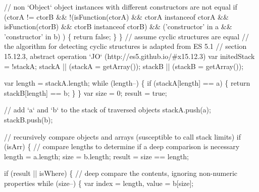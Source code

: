 \begin{DoxyCodeInclude}
        \textcolor{comment}{// non `Object` object instances with different constructors are not equal}
        \textcolor{keywordflow}{if} (ctorA != ctorB &&
              !(isFunction(ctorA) && ctorA instanceof ctorA && isFunction(ctorB) && ctorB instanceof ctorB)
       &&
              (\textcolor{stringliteral}{'constructor'} in a && \textcolor{stringliteral}{'constructor'} in b)
            ) \{
          \textcolor{keywordflow}{return} \textcolor{keyword}{false};
        \}
      \}
      \textcolor{comment}{// assume cyclic structures are equal}
      \textcolor{comment}{// the algorithm for detecting cyclic structures is adapted from ES 5.1}
      \textcolor{comment}{// section 15.12.3, abstract operation `JO` (http://es5.github.io/#x15.12.3)}
      var initedStack = !stackA;
      stackA || (stackA = getArray());
      stackB || (stackB = getArray());

      var length = stackA.length;
      \textcolor{keywordflow}{while} (length--) \{
        \textcolor{keywordflow}{if} (stackA[length] == a) \{
          \textcolor{keywordflow}{return} stackB[length] == b;
        \}
      \}
      var size = 0;
      result = \textcolor{keyword}{true};

      \textcolor{comment}{// add `a` and `b` to the stack of traversed objects}
      stackA.push(a);
      stackB.push(b);

      \textcolor{comment}{// recursively compare objects and arrays (susceptible to call stack limits)}
      \textcolor{keywordflow}{if} (isArr) \{
        \textcolor{comment}{// compare lengths to determine if a deep comparison is necessary}
        length = a.length;
        size = b.length;
        result = size == length;

        \textcolor{keywordflow}{if} (result || isWhere) \{
          \textcolor{comment}{// deep compare the contents, ignoring non-numeric properties}
          \textcolor{keywordflow}{while} (size--) \{
            var index = length,
                value = b[size];


\end{DoxyCodeInclude}
